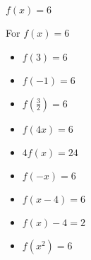 {$f(x) = 6$}
{For $f(x) = 6$ 

\begin{multicols}{2}
\begin{itemize}
\item $f(3) = 6$
\item $f(-1) =6$
\item $f\left(\frac{3}{2} \right) = 6$
\item  $f(4x) = 6$
\item $4f(x) = 24$
\item $f(-x) = 6$
\item  $f(x-4) = 6$ 
\item $f(x) - 4 = 2$
\item  $f\left(x^2\right) = 6$
\end{itemize}
\end{multicols}
}